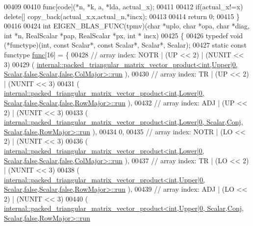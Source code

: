\begin{DoxyCode}
00409 
00410   func[code](*n, *k, a, *lda, actual\_x);
00411 
00412   \textcolor{keywordflow}{if}(actual\_x!=x) \textcolor{keyword}{delete}[] copy\_back(actual\_x,x,actual\_n,*incx);
00413 
00414   \textcolor{keywordflow}{return} 0;
00415 \}
00416 
00424 \textcolor{keywordtype}{int} EIGEN\_BLAS\_FUNC(tpmv)(\textcolor{keywordtype}{char} *uplo, \textcolor{keywordtype}{char} *opa, \textcolor{keywordtype}{char} *diag, \textcolor{keywordtype}{int} *n, RealScalar *pap, RealScalar *px, \textcolor{keywordtype}{int} *
      incx)
00425 \{
00426   \textcolor{keyword}{typedef} void (*functype)(int, \textcolor{keyword}{const} Scalar*, \textcolor{keyword}{const} Scalar*, Scalar*, Scalar);
00427   \textcolor{keyword}{static} \textcolor{keyword}{const} functype \hyperlink{structfunc}{func}[16] = \{
00428     \textcolor{comment}{// array index: NOTR  | (UP << 2) | (NUNIT << 3)}
00429     (
      \hyperlink{structinternal_1_1packed__triangular__matrix__vector__product}{internal::packed\_triangular\_matrix\_vector\_product<int,Upper|0,      
       Scalar,false,Scalar,false,ColMajor>::run}
      ),
00430     \textcolor{comment}{// array index: TR    | (UP << 2) | (NUNIT << 3)}
00431     (
      \hyperlink{structinternal_1_1packed__triangular__matrix__vector__product}{internal::packed\_triangular\_matrix\_vector\_product<int,Lower|0,      
       Scalar,false,Scalar,false,RowMajor>::run}
      ),
00432     \textcolor{comment}{// array index: ADJ   | (UP << 2) | (NUNIT << 3)}
00433     (
      \hyperlink{structinternal_1_1packed__triangular__matrix__vector__product}{internal::packed\_triangular\_matrix\_vector\_product<int,Lower|0,       Scalar,Conj,
       Scalar,false,RowMajor>::run}
      ),
00434     0,
00435     \textcolor{comment}{// array index: NOTR  | (LO << 2) | (NUNIT << 3)}
00436     (
      \hyperlink{structinternal_1_1packed__triangular__matrix__vector__product}{internal::packed\_triangular\_matrix\_vector\_product<int,Lower|0,      
       Scalar,false,Scalar,false,ColMajor>::run}
      ),
00437     \textcolor{comment}{// array index: TR    | (LO << 2) | (NUNIT << 3)}
00438     (
      \hyperlink{structinternal_1_1packed__triangular__matrix__vector__product}{internal::packed\_triangular\_matrix\_vector\_product<int,Upper|0,      
       Scalar,false,Scalar,false,RowMajor>::run}
      ),
00439     \textcolor{comment}{// array index: ADJ   | (LO << 2) | (NUNIT << 3)}
00440     (
      \hyperlink{structinternal_1_1packed__triangular__matrix__vector__product}{internal::packed\_triangular\_matrix\_vector\_product<int,Upper|0,       Scalar,Conj,
       Scalar,false,RowMajor>::run}

\end{DoxyCode}
